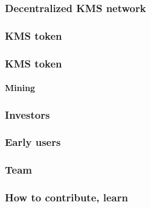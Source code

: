 \documentclass[xetex,mathsans,sans]{beamer}
\begin{document}
    \begin{frame}
        \frametitle{Decentralized KMS network}
    \end{frame}

    \begin{frame}
        \frametitle{KMS token}
    \end{frame}

    \begin{frame}
        \frametitle{KMS token}
        \framesubtitle{Mining}
    \end{frame}

    \begin{frame}
        \frametitle{Investors}
    \end{frame}

    \begin{frame}
        \frametitle{Early users}
    \end{frame}

    \begin{frame}
        \frametitle{Team}
    \end{frame}

    \begin{frame}
        \frametitle{How to contribute, learn}
    \end{frame}
\end{document}
